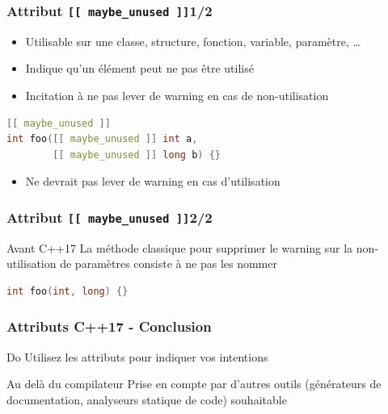 \documentclass[C++.tex]{subfiles}
\begin{document}
\begin{frame}[fragile]
	\frametitle{Attribut \lstinline|[[ maybe_unused ]]|\titlehfill{}1/2}
	\begin{itemize}
		\item Utilisable sur une classe, structure, fonction, variable, paramètre, \ldots
		\item Indique qu'un élément peut ne pas être utilisé
		\item Incitation à ne pas lever de warning en cas de non-utilisation
	\end{itemize}

	\begin{lstlisting}[language=C++]
[[ maybe_unused ]]
int foo([[ maybe_unused ]] int a,
        [[ maybe_unused ]] long b) {}\end{lstlisting}

	\begin{itemize}
		\item Ne devrait pas lever de warning en cas d'utilisation
	\end{itemize}
\end{frame}

\begin{frame}[fragile]
	\frametitle{Attribut \lstinline|[[ maybe_unused ]]|\titlehfill{}2/2}
	\begin{block}{Avant C++17}
		La méthode \og classique\fg{} pour supprimer le warning sur la non-utilisation de paramètres consiste à ne pas les nommer
		\begin{lstlisting}[language=C++]
int foo(int, long) {}\end{lstlisting}

	\end{block}
\end{frame}

\begin{frame}[fragile]
	\frametitle{Attributs C++17 - Conclusion}
	\begin{exampleblock}{Do}
		Utilisez les attributs pour indiquer vos intentions

	\end{exampleblock}

	\begin{block}{Au delà du compilateur}
		Prise en compte par d'autres outils (générateurs de documentation, analyseurs statique de code) souhaitable
	\end{block}
\end{frame}
\end{document}
